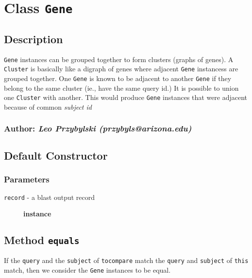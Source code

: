 \section{Class \texttt{Gene}\label{Class_Gene}}
\subsection*{Description\label{Description}}


\texttt{Gene} instances can be grouped together to form clusters (graphs of genes). A
\texttt{Cluster} is basically like a digraph of genes where adjacent \texttt{Gene} instancess are
grouped together. One \texttt{Gene} is known to be adjacent to another \texttt{Gene} if 
they belong to the same cluster (ie., have the same query id.) It is 
possible to union one \texttt{Cluster} with another. This would produce \texttt{Gene}
instances that were adjacent because of common \textit{subject id}

\subsubsection*{Author: \textit{Leo Przybylski (przybyls@arizona.edu)}\label{Author:_Leo_Przybylski_przybyls_arizona_edu_}}
\subsection*{Default Constructor\label{Default_Constructor}}
\subsubsection*{Parameters\label{Parameters}}
\begin{description}

\item[{\texttt{record} - a blast output record}] \textbf{instance}\end{description}
\subsection*{Method \texttt{equals}\label{Method_equals}}


If the \texttt{query} and the \texttt{subject} of \texttt{tocompare} match the \texttt{query} and \texttt{subject} of
\texttt{this} match, then we consider the \texttt{Gene} instances to be equal.

